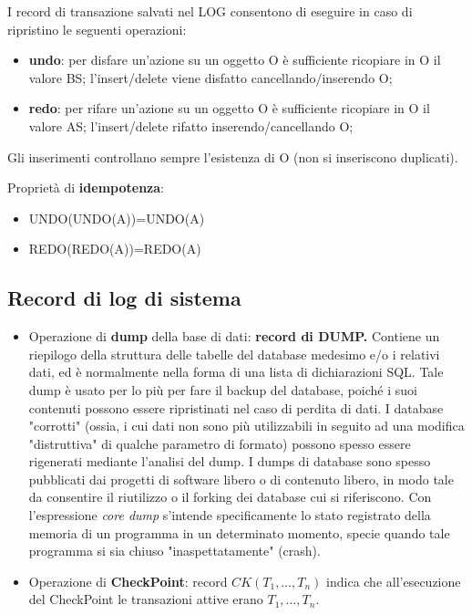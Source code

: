 \documentclass[a4paper, 10pt]{article}
\theoremstyle{definition}
\begin{document}
	I record di transazione salvati nel LOG consentono di eseguire in caso di
	ripristino le seguenti operazioni:
	\begin{itemize}
		\item \textbf{undo}: per disfare un'azione su un oggetto O è sufficiente ricopiare in
		O il valore BS; l'insert/delete viene disfatto cancellando/inserendo O;
		\item \textbf{redo}: per rifare un'azione su un oggetto O è sufficiente ricopiare in O
		il valore AS; l'insert/delete rifatto inserendo/cancellando O;
	\end{itemize}
	
	Gli inserimenti controllano sempre l'esistenza di O (non si inseriscono
	duplicati).
	
	Proprietà di \textbf{idempotenza}:
	\begin{itemize}
		\item{} UNDO(UNDO(A))=UNDO(A)
		\item{} REDO(REDO(A))=REDO(A)
	\end{itemize}
	
	\subsection*{Record di log di sistema}
	\begin{itemize}
		\item Operazione di \textbf{dump} della base di dati: \textbf{record di DUMP.}
		Contiene un riepilogo della struttura delle tabelle del database medesimo e/o i relativi dati, ed è normalmente nella forma di una lista di dichiarazioni SQL. Tale dump è usato per lo più per fare il backup del database, poiché i suoi contenuti possono essere ripristinati nel caso di perdita di dati. I database "corrotti" (ossia, i cui dati non sono più utilizzabili in seguito ad una modifica "distruttiva" di qualche parametro di formato) possono spesso essere rigenerati mediante l'analisi del dump. I dumps di database sono spesso pubblicati dai progetti di software libero o di contenuto libero, in modo tale da consentire il riutilizzo o il forking dei database cui si riferiscono.
		Con l'espressione \textit{core dump} s'intende specificamente lo stato registrato della memoria di un programma in un determinato momento, specie quando tale programma si sia chiuso "inaspettatamente" (crash).
		
		\item Operazione di \textbf{CheckPoint}: record $CK(T_1, \dots, T_n)$ indica che	all'esecuzione del CheckPoint le transazioni attive erano 
		$T_1, \dots, T_n$.
	\end{itemize}
	
\end{document}
